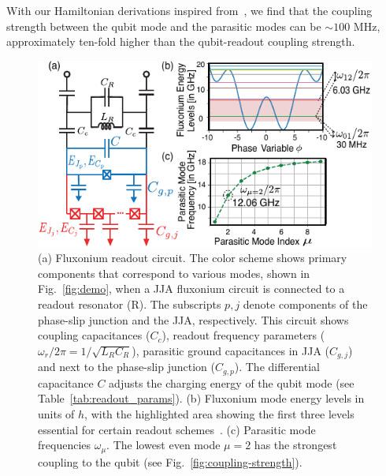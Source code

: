 \documentclass[%
reprint,
superscriptaddress,
 amsmath,amssymb,
 aps,
 prx,
longbibliography,
floatfix,
]{revtex4-2}
\begin{document}
With our Hamiltonian derivations inspired from~\cite{viola2015collective}, we find that the coupling strength between the qubit mode and the parasitic modes can be $\sim 100$ MHz, approximately ten-fold higher than the qubit-readout coupling strength. %
\begin{figure}[htb]
\centering    
\includegraphics[width=\linewidth]{Figures/Meas_Circuit.pdf}
\caption{(a) Fluxonium readout circuit. The color scheme shows primary components that correspond to various modes, shown in Fig.~\ref{fig:demo}, when a JJA fluxonium circuit is connected to a readout resonator (R). The subscripts $p,j$ denote components of the phase-slip junction and the JJA, respectively. This circuit shows coupling capacitances ($C_c$), readout frequency parameters ($\omega_r/2\pi=1/\sqrt{L_{R}C_{R}}$), parasitic ground capacitances in JJA ($C_{g,j}$) and next to the phase-slip junction ($C_{g,p}$). The differential capacitance $C$ adjusts the charging energy of the qubit mode (see Table~\ref{tab:readout_params}). (b) Fluxonium mode energy levels in units of $h$, with the highlighted area showing the first three levels essential for certain readout schemes~\cite{zhang_universal_2021}. (c) Parasitic mode frequencies $\omega_\mu$. The lowest even mode $\mu = 2$ has the strongest coupling to the qubit (see Fig.~\ref{fig:coupling-strength}). 
}
\label{fig:meas_circuit}
\end{figure}
\end{document}
